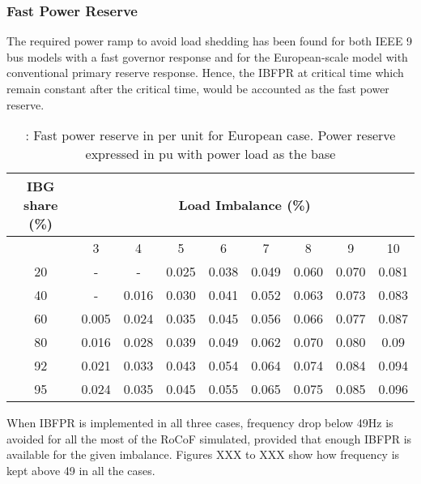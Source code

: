 \subsubsection{Fast Power Reserve}


The required power ramp  to avoid load shedding has been found for both IEEE 9 bus models with a fast governor response and for the European-scale model  with conventional primary reserve response. Hence, the IBFPR at critical time which remain constant after the critical time, would be accounted as the fast power reserve. %

\begin{table}[h]
	\caption{\label{tb:crpowr}: Fast power reserve in per unit for European case. Power reserve expressed in pu with power load as the base}
	\centering
	\begin{tabular}{*9c}
		\toprule
		\textbf{IBG share (\%)}	& \multicolumn{8}{c}{\textbf{Load Imbalance (\%)}} \\
		\midrule
		{} & 3&	4&	5&	6&	7&	8&	9	&10 \\
		\midrule
		20&	-&	-&	0.025&	0.038&	0.049&	0.060&	0.070&	0.081\\
		40&	-&	0.016&	0.030&	0.041&	0.052&	0.063&	0.073&	0.083\\
		60&	0.005&	0.024&	0.035&	0.045&	0.056&	0.066&	0.077&	0.087\\
		80&	0.016&	0.028&	0.039&	0.049&	0.062&	0.070&	0.080&	0.09\\
		92&	0.021&	0.033&	0.043&	0.054&	0.064&	0.074&	0.084&	0.094\\
		95&	0.024&	0.035&	0.045&	0.055&	0.065&	0.075&	0.085&	0.096\\
		\bottomrule
	\end{tabular}
\end{table}

When IBFPR is implemented in all three cases, frequency drop below 49Hz is avoided for all the most of the RoCoF simulated, provided that enough IBFPR is available for the given imbalance. Figures XXX to XXX show how frequency is kept above 49 in all the cases.\\

